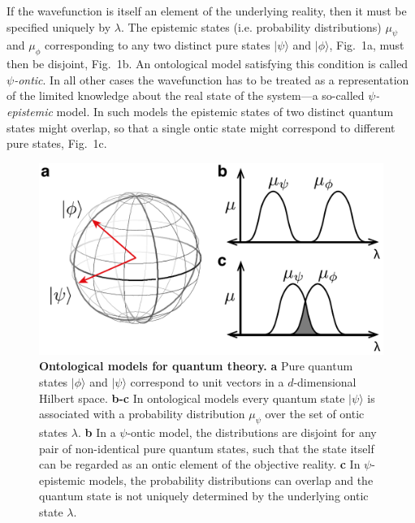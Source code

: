 \documentclass[aps,prl,floatfix,onecolumn,tightenlines,amsmath,amssymb,nofootinbib,12pt]{revtex4-2}
\newcommand{\ket}[1] {| #1 \rangle}
\begin{document}
If the wavefunction is itself an element of the underlying reality, then it must be specified uniquely by $\lambda$. The epistemic states (i.e. probability distributions) $\mu_\psi$ and $\mu_\phi$ corresponding to any two distinct pure states $\ket{\psi}$ and $\ket{\phi}$, Fig.~1a, must then be disjoint, Fig.~1b. An ontological model satisfying this condition is called \emph{$\psi$-ontic}.
In all other cases the wavefunction has to be treated as a representation of the limited knowledge about the real state of the system---a so-called \emph{$\psi$-epistemic} model. In such models the epistemic states of two distinct quantum states might overlap, so that a single ontic state might correspond to different pure states, Fig.~1c.

\begin{figure}[h!]
\begin{center}
\includegraphics[width=\columnwidth]{Figure_1.pdf}
\end{center}
\vspace{-1.5em}
\caption{\textbf{Ontological models for quantum theory.} \textbf{a} Pure quantum states $\ket{\phi}$ and $\ket{\psi}$ correspond to unit vectors in a $d$-dimensional Hilbert space.
\textbf{b-c} In ontological models every quantum state $\ket{\psi}$ is associated with a probability distribution $\mu_\psi$ over the set of ontic states $\lambda$. \textbf{b} In a $\psi$-ontic model, the distributions are disjoint for any pair of non-identical pure quantum states, such that the state itself can be regarded as an ontic element of the objective reality. \textbf{c} In $\psi$-epistemic models, the probability distributions can overlap and the quantum state is not uniquely determined by the underlying ontic state $\lambda$.}
  \label{fig:Motivation}
\end{figure}
\end{document}
